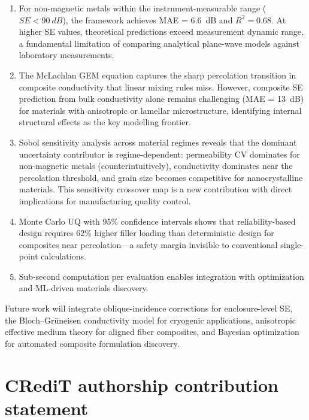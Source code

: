 \documentclass[review,3p,authoryear]{elsarticle}
\begin{document}
\begin{enumerate}
\item For non-magnetic metals within the instrument-measurable range ($SE < \SI{90}{dB}$), the framework achieves MAE = \SI{6.6}{dB} and $R^2 = 0.68$. At higher SE values, theoretical predictions exceed measurement dynamic range, a fundamental limitation of comparing analytical plane-wave models against laboratory measurements.

\item The McLachlan GEM equation captures the sharp percolation transition in composite conductivity that linear mixing rules miss. However, composite SE prediction from bulk conductivity alone remains challenging (MAE = \SI{13}{dB}) for materials with anisotropic or lamellar microstructure, identifying internal structural effects as the key modelling frontier.

\item Sobol sensitivity analysis across material regimes reveals that the dominant uncertainty contributor is regime-dependent: permeability CV dominates for non-magnetic metals (counterintuitively), conductivity dominates near the percolation threshold, and grain size becomes competitive for nanocrystalline materials. This sensitivity crossover map is a new contribution with direct implications for manufacturing quality control.

\item Monte Carlo UQ with 95\% confidence intervals shows that reliability-based design requires 62\% higher filler loading than deterministic design for composites near percolation---a safety margin invisible to conventional single-point calculations.

\item Sub-second computation per evaluation enables integration with optimization and ML-driven materials discovery.
\end{enumerate}

Future work will integrate oblique-incidence corrections for enclosure-level SE, the Bloch--Gr\"uneisen conductivity model for cryogenic applications, anisotropic effective medium theory for aligned fiber composites, and Bayesian optimization for automated composite formulation discovery.

\section*{CRediT authorship contribution statement}
\end{document}
